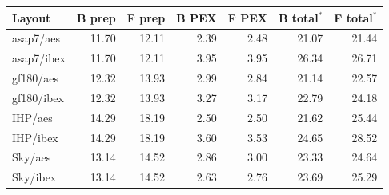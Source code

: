 \begin{tabular}{lrrrrrr}
\toprule
Layout & B prep & F prep & B PEX & F PEX & B total$^*$ & F total$^*$ \\
\midrule
asap7/aes & 11.70 & 12.11 & 2.39 & 2.48 & 21.07 & 21.44 \\
asap7/ibex & 11.70 & 12.11 & 3.95 & 3.95 & 26.34 & 26.71 \\
gf180/aes & 12.32 & 13.93 & 2.99 & 2.84 & 21.14 & 22.57 \\
gf180/ibex & 12.32 & 13.93 & 3.27 & 3.17 & 22.79 & 24.18 \\
IHP/aes & 14.29 & 18.19 & 2.50 & 2.50 & 21.62 & 25.44 \\
IHP/ibex & 14.29 & 18.19 & 3.60 & 3.53 & 24.65 & 28.52 \\
Sky/aes & 13.14 & 14.52 & 2.86 & 3.00 & 23.33 & 24.64 \\
Sky/ibex & 13.14 & 14.52 & 2.63 & 2.76 & 23.69 & 25.29 \\
\bottomrule
\end{tabular}
